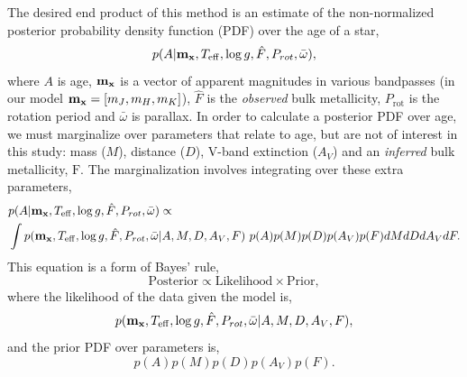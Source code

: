 The desired end product of this method is an estimate of the non-normalized
posterior probability density function (PDF) over the age of a star,
\begin{equation}
p(A|{\bf m_x}, T_{\mathrm{eff}}, \log g, \hat{F}, P_{rot}, \bar{\omega}),
\end{equation}
where $A$ is age, ${\bf m_x}$ is a vector of apparent magnitudes in various
bandpasses (in our model ${\bf m_x} = [m_J, m_H, m_K]$), $\hat{F}$ is the {\it
observed} bulk metallicity, $P_{\mathrm{rot}}$ is the rotation period and
$\bar{\omega}$ is parallax.
In order to calculate a posterior PDF over age, we must marginalize over
parameters that relate to age, but are not of interest in this study: mass
($M$), distance ($D$), V-band extinction ($A_V$) and an {\it inferred} bulk
metallicity, $\mathrm{F}$.
The marginalization involves integrating over these extra parameters,
\begin{eqnarray}
& p(A|{\bf m_x}, T_{\mathrm{eff}}, \log g, \hat{F}, P_{rot}, \bar{\omega})
\propto \\ \nonumber
& \int p({\bf m_x}, T_{\mathrm{eff}}, \log g, \hat{F}, P_{rot}, \bar{\omega}|
A, M, D, A_V, F)~p(A)p(M)p(D)p(A_V)p(F)
dMdDdA_VdF.
\end{eqnarray}
\label{eqn:bayes}
This equation is a form of Bayes' rule,
\begin{equation}
\mathrm{Posterior} \propto \mathrm{Likelihood} \times \mathrm{Prior},
\end{equation}
where the likelihood of the data given the model is,
\begin{equation}
p({\bf m_x}, T_{\mathrm{eff}}, \log g, \hat{F}, P_{rot}, \bar{\omega}|A, M, D,
A_V, F),
\end{equation}
and the prior PDF over parameters is,
\begin{equation}
p(A)p(M)p(D)p(A_V)p(F).
\end{equation}

